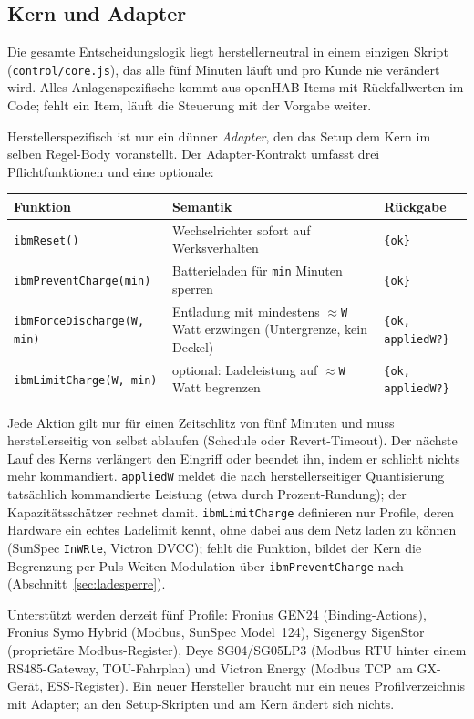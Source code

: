 \documentclass[11pt,a4paper]{article}
\newcommand{\code}[1]{\texttt{#1}}
\begin{document}
\subsection{Kern und Adapter}

Die gesamte Entscheidungslogik liegt herstellerneutral in einem einzigen
Skript (\code{control/core.js}), das alle fünf Minuten läuft und pro Kunde
nie verändert wird. Alles Anlagenspezifische kommt aus openHAB-Items mit
Rückfallwerten im Code; fehlt ein Item, läuft die Steuerung mit der Vorgabe
weiter.

Herstellerspezifisch ist nur ein dünner \emph{Adapter}, den das Setup dem
Kern im selben Regel-Body voranstellt. Der Adapter-Kontrakt umfasst drei
Pflichtfunktionen und eine optionale:

\begin{center}
\small
\begin{tabular}{@{}lll@{}}
\toprule
Funktion & Semantik & Rückgabe \\
\midrule
\code{ibmReset()} & Wechselrichter sofort auf Werksverhalten & \code{\{ok\}} \\
\code{ibmPreventCharge(min)} & Batterieladen für \code{min} Minuten sperren & \code{\{ok\}} \\
\code{ibmForceDischarge(W, min)} & Entladung mit mindestens $\approx$\code{W} Watt erzwingen (Untergrenze, kein Deckel) & \code{\{ok, appliedW?\}} \\
\code{ibmLimitCharge(W, min)} & optional: Ladeleistung auf $\approx$\code{W} Watt begrenzen & \code{\{ok, appliedW?\}} \\
\bottomrule
\end{tabular}
\end{center}

Jede Aktion gilt nur für einen Zeitschlitz von fünf Minuten und muss
hersteller\-seitig von selbst ablaufen (Schedule oder Revert-Timeout). Der
nächste Lauf des Kerns verlängert den Eingriff oder beendet ihn, indem er
schlicht nichts mehr kommandiert. \code{appliedW} meldet die nach
herstellerseitiger Quantisierung tatsächlich kommandierte Leistung (etwa
durch Prozent-Rundung); der Kapazitätsschätzer rechnet damit.
\code{ibmLimitCharge} definieren nur Profile, deren Hardware ein echtes
Ladelimit kennt, ohne dabei aus dem Netz laden zu können (SunSpec
\code{InWRte}, Victron DVCC); fehlt die Funktion, bildet der Kern die
Begrenzung per Puls-Weiten-Modulation über \code{ibmPreventCharge} nach
(Abschnitt~\ref{sec:ladesperre}).

Unterstützt werden derzeit fünf Profile: Fronius GEN24 (Binding-Actions),
Fronius Symo Hybrid (Modbus, SunSpec Model~124), Sigenergy SigenStor
(proprietäre Modbus-Register), Deye SG04/SG05LP3 (Modbus RTU hinter einem
RS485-Gateway, TOU-Fahrplan) und Victron Energy (Modbus TCP am GX-Gerät,
ESS-Register). Ein neuer Hersteller braucht nur ein neues Profilverzeichnis
mit Adapter; an den Setup-Skripten und am Kern ändert sich nichts.
\end{document}
